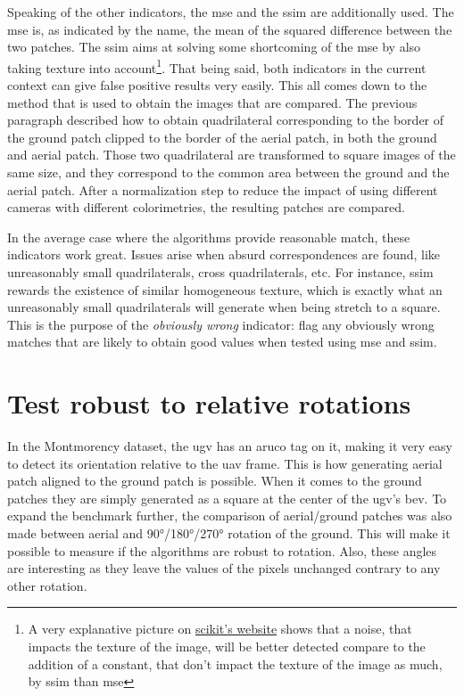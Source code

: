 Speaking of the other indicators, the \gls{mse} and the \gls{ssim} are additionally used.
The \gls{mse} is, as indicated by the name, the mean of the squared difference between the two patches.
The \gls{ssim} aims at solving some shortcoming of the \gls{mse} by also taking texture into account\footnote{A
very explanative picture on \href{https://scikit-image.org/docs/0.25.x/auto_examples/transform/plot_ssim.html}{scikit's website}
shows that a noise, that impacts the texture of the image, will be better detected compare to the addition of a constant,
    that don't impact the texture of the image as much, by \gls{ssim} than \gls{mse}}.
That being said, both indicators in the current context can give false positive results very easily.
This all comes down to the method that is used to obtain the images that are compared.
The previous paragraph described how to obtain quadrilateral corresponding to the border of the ground patch clipped to the
border of the aerial patch, in both the ground and aerial patch.
Those two quadrilateral are transformed to square images of the same size, and they correspond to the common area between the ground and the aerial patch.
After a normalization step to reduce the impact of using different cameras with different colorimetries, the resulting patches are compared.

In the average case where the algorithms provide reasonable match, these indicators work great.
Issues arise when absurd correspondences are found, like unreasonably small quadrilaterals, cross quadrilaterals, etc.
For instance, \gls{ssim} rewards the existence of similar homogeneous texture, which is exactly what an unreasonably small quadrilaterals
will generate when being stretch to a square.
This is the purpose of the \textit{obviously wrong} indicator: flag any obviously wrong matches that are likely
to obtain good values when tested using \gls{mse} and \gls{ssim}.


\section{Test robust to relative rotations}

In the Montmorency dataset, the \gls{ugv} has an aruco tag on it, making it very easy to detect its orientation relative
to the \gls{uav} frame.
This is how generating aerial patch aligned to the ground patch is possible.
When it comes to the ground patches they are simply generated as a square at the center of the \gls{ugv}'s \gls{bev}.
To expand the benchmark further, the comparison of aerial/ground patches was also made between aerial and 90°/180°/270°
rotation of the ground.
This will make it possible to measure if the algorithms are robust to rotation.
Also, these angles are interesting as they leave the values of the pixels unchanged contrary to any other rotation.

